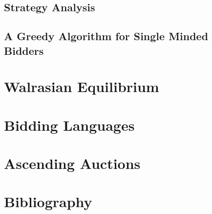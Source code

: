 \documentclass[10pt,onecolumn,letterpaper]{article}
\theoremstyle{definition}
\begin{document}
\subsection{Strategy Analysis}
\subsection{A Greedy Algorithm for Single Minded Bidders}

\section{Walrasian Equilibrium}
\section{Bidding Languages}
\section{Ascending Auctions}


\section{Bibliography}
\end{document}
